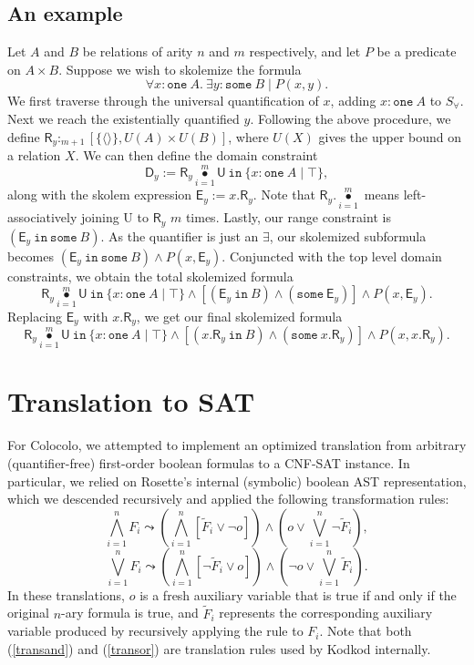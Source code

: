 \documentclass[10pt]{article}
\theoremstyle{definition}
\DeclareMathOperator{\bigdot}{\bullet}
\begin{document}
  \subsection{An example}
  Let $A$ and $B$ be relations of arity $n$ and $m$ respectively, and let $P$ be a predicate on $A\times B$. Suppose we wish to skolemize the formula
  \[\forall x : \texttt{one}\: A. \: \exists y : \texttt{some}\: B \mid P(x,y).\]
  We first traverse through the universal quantification of $x$, adding $x : \texttt{one}\: A$ to $S_\forall$. Next we reach the existentially quantified $y$. Following the above procedure, we define $\textsf{R}_y :_{m + 1} [\{\langle \rangle\}, U(A)\times U(B)]$, where $U(X)$ gives the upper bound on a relation $X$. We can then define the domain constraint
  \[\textsf{D}_y := \textsf{R}_y \bigdot\limits_{i = 1}^m \textsf{U}~\texttt{in}~\{x : \texttt{one}\: A \mid \top\},\]
  along with the skolem expression $\textsf{E}_y := x.\textsf{R}_y$. Note that $\textsf{R}_y .\bigdot\limits_{i = 1}^m$ means left-associatively joining \textsf{U} to $\textsf{R}_y$ $m$ times. Lastly, our range constraint is $(\textsf{E}_y~\texttt{in}~\texttt{some}~B)$. As the quantifier is just an $\exists$, our skolemized subformula becomes $(\textsf{E}_y ~ \texttt{in}~\texttt{some}~B) \land P(x, \textsf{E}_y)$. Conjuncted with the top level domain constraints, we obtain the total skolemized formula
  \[\textsf{R}_y \bigdot\limits_{i = 1}^m \textsf{U}~\texttt{in}~\{x : \texttt{one}\: A \mid \top\} \land [(\textsf{E}_y ~ \texttt{in}~B) \land (\texttt{some} ~\textsf{E}_y)] \land P(x, \textsf{E}_y).\]
  Replacing $\textsf{E}_y$ with $x.\textsf{R}_y$, we get our final skolemized formula
  \[\textsf{R}_y \bigdot\limits_{i = 1}^m \textsf{U}~\texttt{in}~\{x : \texttt{one}\: A \mid \top\} \land [(x.\textsf{R}_y ~ \texttt{in}~B) \land (\texttt{some} ~x.\textsf{R}_y)] \land P(x, x.\textsf{R}_y).\]

  \section{Translation to SAT}
  For Colocolo, we attempted to implement an optimized translation from arbitrary (quantifier-free) first-order boolean formulas to a CNF-SAT instance. In particular, we relied on Rosette's internal (symbolic) boolean AST representation, which we descended recursively and applied the following transformation rules:
  \begin{equation}\label{transand}
    \bigwedge_{i=1}^n F_i \leadsto \left(\bigwedge_{i=1}^n [\tilde{F}_i \lor \neg o]\right) \land \left(o \lor \bigvee_{i=1}^n \neg\tilde{F}_i\right),
  \end{equation}
  \begin{equation}\label{transor}
    \bigvee_{i=1}^n F_i \leadsto \left(\bigwedge_{i=1}^n [\neg\tilde{F}_i \lor o]\right) \land \left(\neg o \lor \bigvee_{i=1}^n \tilde{F}_i\right).
  \end{equation}
  In these translations, $o$ is a fresh auxiliary variable that is true if and only if the original $n$-ary formula is true, and $\tilde{F}_i$ represents the corresponding auxiliary variable produced by recursively applying the rule to $F_i$. Note that both (\ref{transand}) and (\ref{transor}) are translation rules used by Kodkod internally.
\end{document}
